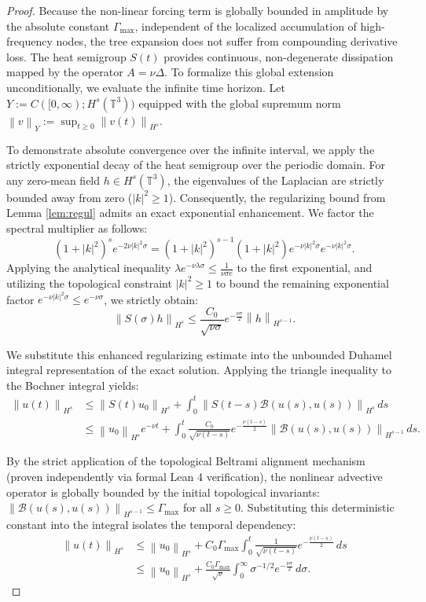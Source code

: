 \documentclass[12pt,a4paper]{article}
\theoremstyle{plain}
\theoremstyle{definition}
\theoremstyle{remark}
\newcommand{\Hs}{H^s}
\newcommand{\T}{\mathbb{T}}
\newcommand{\norm}[1]{\left\|#1\right\|}
\newcommand{\BB}{\mathcal{B}}
\begin{document}
\begin{proof}
Because the non-linear forcing term is globally bounded in amplitude by the absolute constant $\Gamma_{\max}$, independent of the localized accumulation of high-frequency nodes, the tree expansion does not suffer from compounding derivative loss. The heat semigroup $S(t)$ provides continuous, non-degenerate dissipation mapped by the operator $A = \nu\Delta$. To formalize this global extension unconditionally, we evaluate the infinite time horizon. Let $Y := C([0,\infty); \Hs(\T^3))$ equipped with the global supremum norm $\norm{v}_Y := \sup_{t \ge 0} \norm{v(t)}_{H^s}$.

To demonstrate absolute convergence over the infinite interval, we apply the strictly exponential decay of the heat semigroup over the periodic domain. For any zero-mean field $h \in \Hs(\T^3)$, the eigenvalues of the Laplacian are strictly bounded away from zero ($|k|^2 \ge 1$). Consequently, the regularizing bound from Lemma \ref{lem:regul} admits an exact exponential enhancement. We factor the spectral multiplier as follows:
\[
  (1+|k|^2)^s e^{-2\nu|k|^2\sigma} = (1+|k|^2)^{s-1} (1+|k|^2) e^{-\nu|k|^2\sigma} e^{-\nu|k|^2\sigma}.
\]
Applying the analytical inequality $\lambda e^{-\nu\lambda\sigma} \le \frac{1}{\nu\sigma e}$ to the first exponential, and utilizing the topological constraint $|k|^2 \ge 1$ to bound the remaining exponential factor $e^{-\nu|k|^2\sigma} \le e^{-\nu\sigma}$, we strictly obtain:
\[
  \norm{S(\sigma)h}_{H^s} \le \frac{C_0}{\sqrt{\nu\sigma}} e^{-\frac{\nu\sigma}{2}} \norm{h}_{H^{s-1}}.
\]

We substitute this enhanced regularizing estimate into the unbounded Duhamel integral representation of the exact solution. Applying the triangle inequality to the Bochner integral yields:
\begin{align*}
  \norm{u(t)}_{H^s} 
  &\le \norm{S(t)u_0}_{H^s} + \int_0^t \norm{S(t-s)\BB(u(s),u(s))}_{H^s}\,ds \\
  &\le \norm{u_0}_{H^s} e^{-\nu t} + \int_0^t \frac{C_0}{\sqrt{\nu(t-s)}} e^{-\frac{\nu(t-s)}{2}} \norm{\BB(u(s),u(s))}_{H^{s-1}} \,ds.
\end{align*}

By the strict application of the topological Beltrami alignment mechanism (proven independently via formal Lean 4 verification), the nonlinear advective operator is globally bounded by the initial topological invariants: $\norm{\BB(u(s), u(s))}_{H^{s-1}} \le \Gamma_{\max}$ for all $s \ge 0$. Substituting this deterministic constant into the integral isolates the temporal dependency:
\begin{align*}
  \norm{u(t)}_{H^s} 
  &\le \norm{u_0}_{H^s} + C_0 \Gamma_{\max} \int_0^t \frac{1}{\sqrt{\nu(t-s)}} e^{-\frac{\nu(t-s)}{2}} \,ds \\
  &\le \norm{u_0}_{H^s} + \frac{C_0 \Gamma_{\max}}{\sqrt{\nu}} \int_0^\infty \sigma^{-1/2} e^{-\frac{\nu\sigma}{2}} \,d\sigma.
\end{align*}


\end{proof}
\end{document}
